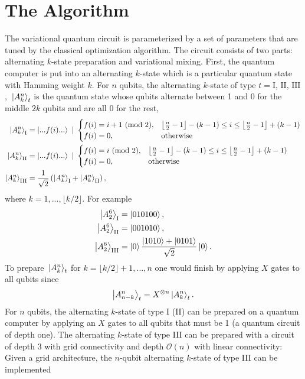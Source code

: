 \documentclass[10pt]{article}
\begin{document}
\section{The Algorithm}
The variational quantum circuit is parameterized by a set of parameters that are tuned by the classical optimization algorithm. The circuit consists of two parts: alternating $k$-state preparation and variational mixing. First, the quantum computer is put into an alternating $k$-state which is a particular quantum state with Hamming weight $k$. For $n$ qubits, the alternating $k$-state of type $t=\text{I, II, III}$, $\ket*{A^n_k}_{t}$ is the quantum state whose qubits alternate between 1 and 0 for the middle $2k$ qubits and are all 0 for the rest,
\begin{align}
\ket{A^n_k}_\text{I} &= \ket{...f(i)...} \ | \  \begin{cases}
f(i)= i+1 \ (\text{mod} \  2), & \left\lfloor\frac{n}{2}-1\right\rfloor - (k-1) \leq i \leq \left\lfloor\frac{n}{2}-1\right\rfloor + (k-1)
\\
f(i)= 0, & \text{otherwise}
\end{cases}
\\
\ket{A^n_k}_\text{II} &= \ket{...f(i)...} \ | \  \begin{cases}
f(i)= i \ (\text{mod} \  2), & \left\lfloor\frac{n}{2}-1\right\rfloor - (k-1) \leq i \leq \left\lfloor\frac{n}{2}-1\right\rfloor + (k-1)
\\
f(i)= 0, & \text{otherwise}
\end{cases}
\\
\ket{A^n_k}_\text{III} &= \frac{1}{\sqrt{2}}\left(\ket{A^n_k}_\text{I}+ \ket{A^n_k}_\text{II}\right)
,\end{align}
where $k=1,...,\lfloor k/2 \rfloor$.
For example
\begin{align}
\ket{A^6_2}_\text{I} &= \ket{010100},
\\
\ket{A^6_2}_\text{II} &= \ket{001010},
\\
\ket{A^6_2}_\text{III} &= \ket{0}\frac{\ket{1010}+\ket{0101}}{\sqrt{2}}\ket{0}
.\end{align}
To prepare $\ket*{A^n_k}_t$ for $k=\lfloor k/2 \rfloor+1,...,n$ one would finish by applying $X$ gates to all qubits since
\begin{align}
\ket{A^n_{n-k}}_t=X^{\otimes n}\ket{A^n_k}_t
.\end{align}
For $n$ qubits, the alternating $k$-state of type I (II) can be prepared on a quantum computer by applying an $X$ gates to all qubits that must be 1 (a quantum circuit of depth one). The alternating $k$-state of type III can be prepared with a circuit of depth $3$ with grid connectivity and depth $\mathcal{O}(n)$ with linear connectivity: Given a grid architecture, the $n$-qubit alternating $k$-state of type III can be implemented
\end{document}
